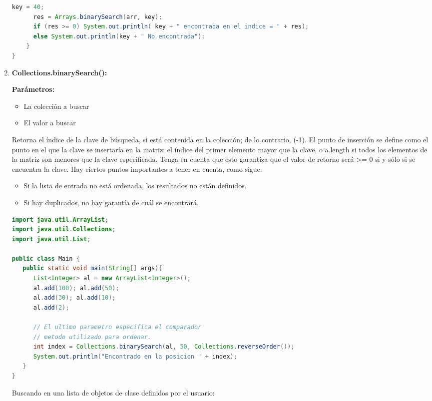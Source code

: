 \begin{enumerate}
\begin{lstlisting}[language=Java]
      key = 40;
      res = Arrays.binarySearch(arr, key);
      if (res >= 0) System.out.println( key + " encontrada en el indice = " + res);
      else System.out.println(key + " No encontrada");
	}
}
\end{lstlisting}
   
   \item \textbf{Collections.binarySearch():} 
   
   \textbf{Parámetros:}
   
   \begin{itemize}
   	\item La colección a buscar
   	\item  El valor a buscar
   \end{itemize}
   
   Retorna el índice de la clave de búsqueda, si está contenida en la colección; de lo contrario, (-1). El punto de inserción se define como el punto en el que la clave se insertaría en la matriz: el índice del primer elemento mayor que la clave, o a.length si todos los elementos de la matriz son menores que la clave especificada. Tenga en cuenta que esto garantiza que el valor de retorno será >= 0 si y sólo si se encuentra la clave. Hay ciertos puntos importantes a tener en cuenta, como sigue:
   
   \begin{itemize}
   	\item Si la lista de entrada no está ordenada, los resultados no están definidos.
   	\item Si hay duplicados, no hay garantía de cuál se encontrará. 
   \end{itemize}
   
   \begin{lstlisting}[language=Java]
import java.util.ArrayList;
import java.util.Collections;
import java.util.List;

public class Main {
   public static void main(String[] args){
      List<Integer> al = new ArrayList<Integer>();
      al.add(100); al.add(50);
      al.add(30); al.add(10);
      al.add(2);
      
      // El ultimo parametro especifica el comparador
      // metodo utilizado para ordenar.
      int index = Collections.binarySearch(al, 50, Collections.reverseOrder());
      System.out.println("Encontrado en la posicion " + index);
   }
}
\end{lstlisting}

Buscando en una lista de objetos de clase definidos por el usuario:


\end{enumerate}
